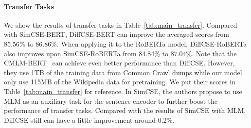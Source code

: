\documentclass[11pt]{article}
\newcommand{\ba}{\xspace}
\begin{document}
\paragraph{Transfer Tasks}
We show the results of transfer tasks in Table~\ref{tab:main_transfer}. Compared with SimCSE-BERT\ba, DiffCSE-BERT\ba can improve the averaged scores from 85.56\% to 86.86\%. When applying it to the RoBERTa model, DiffCSE-RoBERTa\ba also improves upon SimCSE-RoBERTa\ba from 84.84\% to 87.04\%.
Note that the CMLM-BERT\ba~\cite{yang2020universal} can achieve even better performance than DiffCSE. However, they use 1TB of the training data from Common Crawl dumps while our model only use 115MB of the Wikipedia data for pretraining. We put their scores in Table~\ref{tab:main_transfer} for reference.
In SimCSE, the authors propose to use MLM as an auxiliary task for the sentence encoder to further boost the performance of transfer tasks. Compared with the results of SimCSE with MLM, DiffCSE still can have a little improvement around 0.2\%. 
\end{document}
